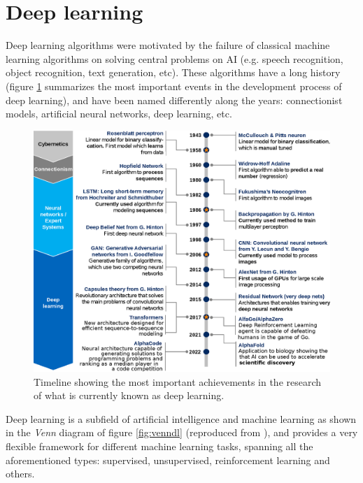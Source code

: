 \section{Deep learning}

Deep learning algorithms were motivated by the failure of classical machine learning algorithms on solving central problems on AI (e.g. speech recognition, object recognition, text generation, etc). These algorithms have a long history (figure \ref{fig:dl-timeline} summarizes the most important events in the development process of deep learning), and have been named differently along the years: connectionist models, artificial neural networks, deep learning, etc.

\begin{figure}
	\centering
	\includegraphics[width=1.0\linewidth]{background/images/DL-timeline}
	\caption[Deep learning history timeline]{Timeline showing the most important achievements in the research of what is currently known as deep learning.}
	\label{fig:dl-timeline}
\end{figure}


Deep learning is a subfield of artificial intelligence and machine learning as shown in the \textit{Venn} diagram of figure \ref{fig:venndl} (reproduced from \cite{Goodfellow2016}), and provides a very flexible framework for different machine learning tasks, spanning all the aforementioned types: supervised, unsupervised, reinforcement learning and others.

